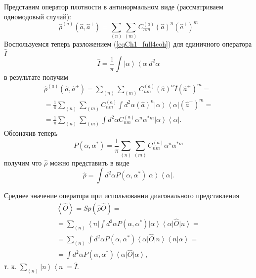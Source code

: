 Представим оператор плотности в
антинормальном виде (рассматриваем одномодовый случай): 
\begin{equation}
\hat{\rho}^{\left(a\right)}\left(\hat{a},\hat{a}^{+}\right) = 
\sum_{(n)}\sum_{(m)}C^{\left(a\right)}_{nm}\left(\hat{a}\right)^n\left(\hat{a}^{+}\right)^m
\end{equation}
Воспользуемся теперь разложением (\ref{eqCh1_full4coh}) для единичного
оператора $\hat{I}$
\[
\hat{I} = \frac{1}{\pi}\int \left|\alpha\right>\left<\alpha\right| d^2 \alpha
\]
в результате получим
\begin{eqnarray}
\hat{\rho}^{\left(a\right)}\left(\hat{a},\hat{a}^{+}\right) = 
\sum_{(n)}\sum_{(m)}C^{\left(a\right)}_{nm}\left(\hat{a}\right)^n\hat{I}\left(\hat{a}^{+}\right)^m
= 
\nonumber \\
= \frac{1}{\pi}\sum_{(n)}\sum_{(m)}C^{\left(a\right)}_{nm}\int d^2 \alpha
\left(\hat{a}\right)^n
\left|\alpha\right>\left<\alpha\right|
\left(\hat{a}^{+}\right)^m = 
\nonumber \\
= \frac{1}{\pi}\sum_{(n)}\sum_{(m)}\int d^2 \alpha
C^{\left(a\right)}_{nm}
\alpha^n
\alpha^{*m}
\left|\alpha\right>\left<\alpha\right|.
\end{eqnarray}
Обозначив теперь 
\[
P\left(\alpha, \alpha^{*}\right) = \frac{1}{\pi}\sum_{(n)}\sum_{(m)}
C^{\left(a\right)}_{nm}
\alpha^n
\alpha^{*m}
\]
получим что $\hat{\rho}$ можно представить в виде
\begin{equation}
\hat{\rho} = \int d^2 \alpha P\left(\alpha, \alpha^{*}\right) 
\left|\alpha\right>\left<\alpha\right|.
\label{eqCh1_Rho_in_alpha}
\end{equation}

Среднее значение оператора при использовании
диагонального представления 
\begin{eqnarray}
\left<\hat{O}\right> = Sp \left(\hat{\rho}\hat{O}\right) =
\nonumber \\
= \sum_{(n)}\left<n\right|
\int d^2 \alpha P\left(\alpha, \alpha^{*}\right) 
\left|\alpha\right>\left<\alpha\right|
\hat{O}\left|n\right> =
\nonumber \\
= \sum_{(n)} \int d^2 \alpha P\left(\alpha, \alpha^{*}\right)
\left<\alpha\right|\hat{O}\left|n\right>
\left<n\right|\left.\alpha\right> = 
\nonumber \\
=  
\int d^2 \alpha P\left(\alpha, \alpha^{*}\right)
\left<\alpha\right|\hat{O}\left|\alpha\right>,
\label{eqCh1_middleO}
\end{eqnarray}
т. к. $\sum_{(n)}\left|n\right>\left<n\right| = \hat{I}$. 

